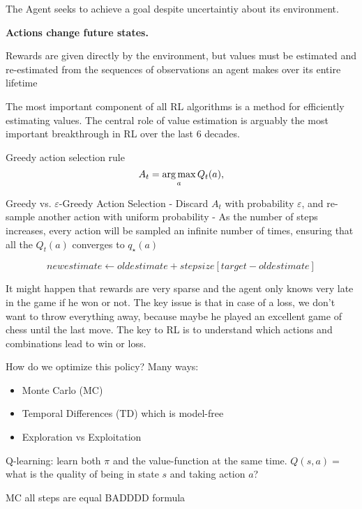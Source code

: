 The Agent seeks to achieve a goal despite uncertaintiy about its environment.

\textbf{Actions change future states.}

Rewards are given directly by the environment, but values must be estimated and re-estimated from the sequences of observations an agent makes over its entire lifetime

The most important component of all RL algorithms is a method for efficiently estimating values.
The central role of value estimation is arguably the most important breakthrough in RL over the last 6 decades.


Greedy action selection rule
\[
A_{t} = \operatorname*{arg\,max}_{a} Q_{t}(a),
\]

Greedy vs. $\varepsilon$-Greedy Action Selection
- Discard $A_{t}$ with probability $\varepsilon$, and re-sample another action with uniform probability
- As the number of steps increases, every action will be sampled an infinite number of times, ensuring that all the $Q_{t}(a)$ converges to $q_{\star}(a)$


\[
  newestimate \leftarrow oldestimate + stepsize[target - oldestimate]
\]





It might happen that rewards are very sparse and the agent only knows very late in the game if he won or not. The key issue is that in case of a loss, we don't want to throw everything away, because maybe he played an excellent game of chess until the last move. The key to RL is to understand which actions and combinations lead to win or loss.

How do we optimize this policy? Many ways:
\begin{itemize}
  \item Monte Carlo (MC)
  \item Temporal Differences (TD) which is model-free
  \item Exploration vs Exploitation
\end{itemize}


Q-learning: learn both $\pi$ and the value-function at the same time. $Q(s,a)=$ what is the quality of being in state $s$ and taking action $a$?









MC all steps are equal BADDDD
formula
